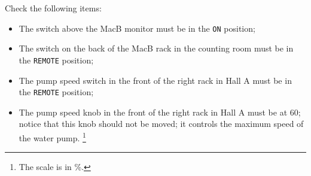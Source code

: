 Check the following items:
\begin{itemize}
 \item The switch above the MacB monitor must be in the \verb.ON. position; 
 \item The switch on the back of the MacB rack in the counting room must be in 
	the \verb.REMOTE. position;
 \item The pump speed switch in the front of the right rack in
 	Hall A must be in the \verb.REMOTE. position;
 \item The pump speed knob in the front of the right rack in Hall
 	A must be at 60; notice that this knob should not be
 	moved; it controls the maximum speed of the water pump.
	 \footnote{The scale is in \%.} 
\end{itemize}
%
%
%
%
%
